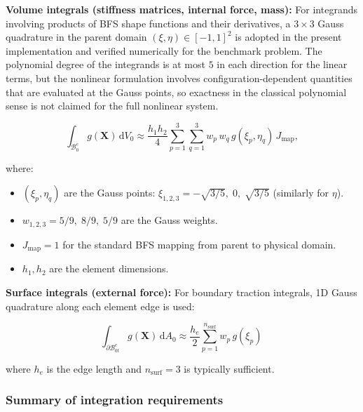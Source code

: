 \documentclass[11pt]{article}
\begin{document}
\textbf{Volume integrals (stiffness matrices, internal force, mass):}
For integrands involving products of BFS shape functions and their
derivatives, a $3\times 3$ Gauss quadrature in the parent domain
$(\xi,\eta)\in[-1,1]^{2}$ is adopted in the present implementation
and verified numerically for the benchmark problem. The polynomial
degree of the integrands is at most $5$ in each direction for the
linear terms, but the nonlinear formulation involves configuration-dependent
quantities that are evaluated at the Gauss points, so exactness in the
classical polynomial sense is not claimed for the full nonlinear system.

\begin{equation}
\int_{\mathcal{B}_{0}^{e}} g(\mathbf{X})\,\mathrm{d}V_{0}
\approx \frac{h_{1}h_{2}}{4}\sum_{p=1}^{3}\sum_{q=1}^{3}
w_{p}\,w_{q}\,g(\xi_{p},\eta_{q})\,J_{\mathrm{map}},
\label{s7:gauss_volume}
\end{equation}

where:
\begin{itemize}
\item $(\xi_{p},\eta_{q})$ are the Gauss points:
  $\xi_{1,2,3} = -\sqrt{3/5},\;0,\;\sqrt{3/5}$
  (similarly for $\eta$).
\item $w_{1,2,3} = 5/9,\;8/9,\;5/9$ are the Gauss weights.
\item $J_{\mathrm{map}}=1$ for the standard BFS mapping from parent
  to physical domain.
\item $h_{1},h_{2}$ are the element dimensions.
\end{itemize}

\textbf{Surface integrals (external force):}
For boundary traction integrals, 1D Gauss quadrature along each
element edge is used:

\begin{equation}
\int_{\partial\mathcal{B}_{0t}^{e}} g(\mathbf{X})\,\mathrm{d}A_{0}
\approx \frac{h_{e}}{2}\sum_{p=1}^{n_{\mathrm{surf}}}
w_{p}\,g(\xi_{p})\,
\end{equation}

where $h_{e}$ is the edge length and $n_{\mathrm{surf}}=3$ is typically
sufficient.

\subsubsection{Summary of integration requirements}
\end{document}
